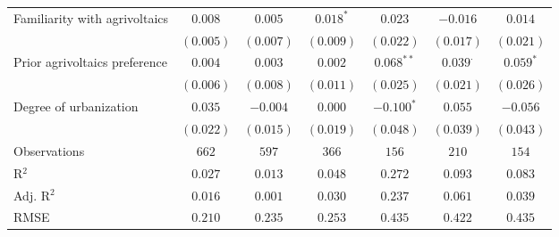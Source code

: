\begin{center}
\begin{small}
\begin{longtable}{l@{} c@{} c@{} c@{} c@{} c@{} c@{}}
\quad Familiarity with agrivoltaics & $0.008$      & $0.005$          & $0.018^{*}$      & $0.023$        & $-0.016$        & $0.014$     \\
                                    & $(0.005)$    & $(0.007)$        & $(0.009)$        & $(0.022)$      & $(0.017)$       & $(0.021)$   \\
\quad Prior agrivoltaics preference & $0.004$      & $0.003$          & $0.002$          & $0.068^{**}$   & $0.039^{\cdot}$ & $0.059^{*}$ \\
                                    & $(0.006)$    & $(0.008)$        & $(0.011)$        & $(0.025)$      & $(0.021)$       & $(0.026)$   \\
\quad Degree of urbanization        & $0.035$      & $-0.004$         & $0.000$          & $-0.100^{*}$   & $0.055$         & $-0.056$    \\
                                    & $(0.022)$    & $(0.015)$        & $(0.019)$        & $(0.048)$      & $(0.039)$       & $(0.043)$   \\
\hline
Observations                        & $662$        & $597$            & $366$            & $156$          & $210$           & $154$       \\
R$^2$                               & $0.027$      & $0.013$          & $0.048$          & $0.272$        & $0.093$         & $0.083$     \\
Adj. R$^2$                          & $0.016$      & $0.001$          & $0.030$          & $0.237$        & $0.061$         & $0.039$     \\
RMSE                                & $0.210$      & $0.235$          & $0.253$          & $0.435$        & $0.422$         & $0.435$     \\
\end{longtable}
\end{small}
\end{center}
